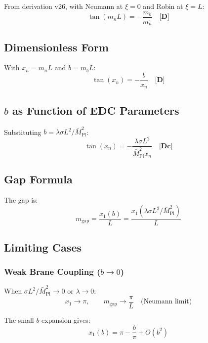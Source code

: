 \documentclass[11pt,a4paper]{article}
\newcommand{\Mpl}{\bar{M}_{\mathrm{Pl}}}
\newcommand{\mgap}{m_{\mathrm{gap}}}
\newcommand{\mb}{m_b}
\newcommand{\tagD}{\textbf{[D]}}
\newcommand{\tagDc}{\textbf{[Dc]}}
\theoremstyle{definition}
\theoremstyle{plain}
\theoremstyle{remark}
\begin{document}
From derivation v26, with Neumann at $\xi = 0$ and Robin at $\xi = L$:
\begin{equation}
\tan(m_n L) = -\frac{\mb}{m_n} \quad \tagD{}
\label{eq:v26-spectral}
\end{equation}

\subsection{Dimensionless Form}

With $x_n = m_n L$ and $b = \mb L$:
\begin{equation}
\tan(x_n) = -\frac{b}{x_n} \quad \tagD{}
\label{eq:dimensionless-spectral}
\end{equation}

\subsection{$b$ as Function of EDC Parameters}

Substituting $b = \lambda\sigma L^2/\Mpl^2$:
\begin{equation}
\tan(x_n) = -\frac{\lambda\sigma L^2}{\Mpl^2 x_n} \quad \tagDc{}
\label{eq:spectral-sigma}
\end{equation}

\subsection{Gap Formula}

The gap is:
\begin{equation}
\mgap = \frac{x_1(b)}{L} = \frac{x_1(\lambda\sigma L^2/\Mpl^2)}{L}
\label{eq:gap-formula}
\end{equation}

\subsection{Limiting Cases}

\subsubsection{Weak Brane Coupling ($b \to 0$)}

When $\sigma L^2/\Mpl^2 \to 0$ or $\lambda \to 0$:
\begin{equation}
x_1 \to \pi, \qquad \mgap \to \frac{\pi}{L} \quad \text{(Neumann limit)}
\label{eq:neumann-limit}
\end{equation}

The small-$b$ expansion gives:
\begin{equation}
x_1(b) = \pi - \frac{b}{\pi} + O(b^2)
\label{eq:small-b-expansion}
\end{equation}
\end{document}

